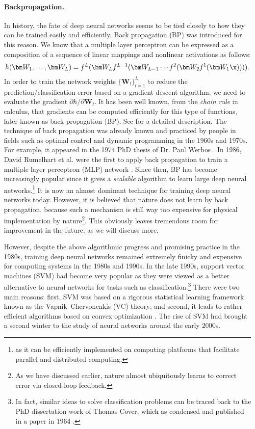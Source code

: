 \documentclass[../../book-main.tex]{subfiles}
\begin{document}
\paragraph{Backpropagation.}
In history, the fate of deep neural networks seems to be tied closely to how they can be trained easily and efficiently. Back propagation (BP) was introduced for this reason. We know that a multiple layer perceptron can be expressed as a  composition of a sequence of linear mappings and nonlinear activations as follows:
\begin{equation}
h(\bm W_1, \ldots, \bm W_L) = f^L(\bm W_Lf^{L-1}(\bm W_{L-1} \cdots f^2(\bm W_2f^1(\bm W_1\x)))).
\end{equation}
In order to train the network weights $\{\bm W_l\}_{l=1}^L$ to reduce the prediction/classification error based on a gradient descent algorithm, we need to evaluate the gradient ${\partial h}/{\partial \bm W_l}$. It has been well known, from the {\em chain rule} in calculus, that gradients can be computed efficiently for this type of functions, later known as back propagation (BP). See  for a detailed description. The technique of back propagation was already known and practiced by people in fields such as optimal control and dynamic programming in the 1960s and 1970s. For example, it appeared in the 1974 PhD thesis of Dr. Paul Werbos \cite{Werbos-1974, Werbos1994TheRO}. In 1986, David Rumelhart et al. were the first to apply back propagation  to train a multiple layer perceptron (MLP) network \cite{Rumelhart1986}. Since then,  BP has become increasingly popular since it gives a {\em scalable} algorithm to learn large deep neural networks.\footnote{as it can be efficiently implemented on computing platforms that facilitate parallel and distributed computing.} It is now an almost dominant technique for training deep neural networks today. However, it is believed that nature does not learn by back propagation,  because such a mechanism is still way too expensive for physical implementation by nature\footnote{As we have discussed earlier, nature almost ubiquitously learns to correct error via closed-loop feedback.}. This obviously leaves tremendous room for improvement in the future, as we will discuss more.

However, despite the above algorithmic progress and promising practice in the 1980s, training deep neural networks remained extremely finicky and expensive for computing systems in the 1980s and 1990s. In the late 1990s, support vector machines (SVM) \cite{SVM-1995} had become very popular as they were viewed as a better alternative to neural networks for tasks such as classification.\footnote{In fact, similar ideas to solve classification problems can be traced back to the PhD dissertation work of Thomas Cover, which as condensed and published in a paper in 1964  \cite{Cover-1964}.} There were two main reasons: first, SVM was based on a rigorous statistical learning framework known as the Vapnik--Chervonenkis (VC) theory; and second, it leads to rather efficient algorithms based on convex optimization \cite{BoydVa04}. The rise of SVM had brought a second winter to the study of neural networks around the early 2000s. 
\end{document}
